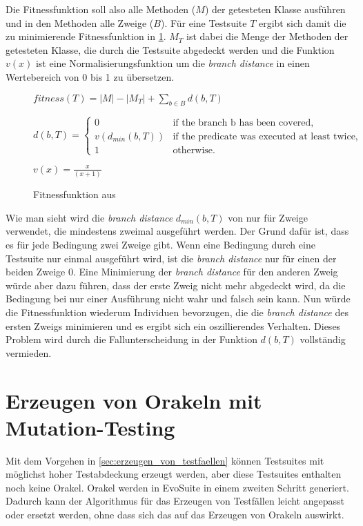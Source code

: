 \documentclass[a4paper,11pt]{article}
\begin{document}
Die Fitnessfunktion soll also alle Methoden ($M$) der getesteten Klasse ausführen und in den Methoden alle Zweige ($B$).
Für eine Testsuite $T$ ergibt sich damit die zu minimierende Fitnessfunktion in \cref{fig:fitnessfunktion}.
$M_T$ ist dabei die Menge der Methoden der getesteten Klasse, die durch die Testsuite abgedeckt werden und die Funktion $v(x)$ ist eine Normalisierungsfunktion um die \textit{branch distance} in einen Wertebereich von 0 bis 1 zu übersetzen.

\begin{figure}[h]
	$fitness(T) = |M| - |M_T| + \sum\limits_{b \in B} d(b, T)$

	$d(b, T) = \begin{cases}
	0 & \text{if the branch b has been covered,}\\
	v(d_{min}(b, T)) & \text{if the predicate was executed at least twice,}\\
	1 & \text{otherwise.}
	\end{cases}$

	$v(x) = \frac{x}{(x+1)}$
	\caption{Fitnessfunktion aus \cite{TSE12_EvoSuite}}
	\label{fig:fitnessfunktion}
\end{figure}

Wie man sieht wird die \textit{branch distance} $d_{min}(b, T)$ von \citet{10.1109/32.57624} nur für Zweige verwendet, die mindestens zweimal ausgeführt werden.
Der Grund dafür ist, dass es für jede Bedingung zwei Zweige gibt.
Wenn eine Bedingung durch eine Testsuite nur einmal ausgeführt wird, ist die \textit{branch distance} nur für einen der beiden Zweige 0.
Eine Minimierung der \textit{branch distance} für den anderen Zweig würde aber dazu führen, dass der erste Zweig nicht mehr abgedeckt wird, da die Bedingung bei nur einer Ausführung nicht wahr und falsch sein kann.
Nun würde die Fitnessfunktion wiederum Individuen bevorzugen, die die \textit{branch distance} des ersten Zweigs minimieren und es ergibt sich ein oszillierendes Verhalten.
Dieses Problem wird durch die Fallunterscheidung in der Funktion $d(b, T)$ vollständig vermieden.

\section{Erzeugen von Orakeln mit Mutation-Testing}
\label{sec:erzeugen_von_orakeln}

Mit dem Vorgehen in \cref{sec:erzeugen_von_testfaellen} können Testsuites mit möglichst hoher Testabdeckung erzeugt werden, aber diese Testsuites enthalten noch keine Orakel.
Orakel werden in EvoSuite in einem zweiten Schritt generiert.
Dadurch kann der Algorithmus für das Erzeugen von Testfällen leicht angepasst oder ersetzt werden, ohne dass sich das auf das Erzeugen von Orakeln auswirkt.
\end{document}
